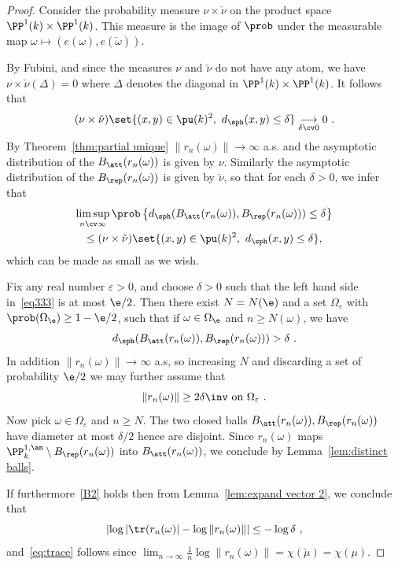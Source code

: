 \begin{proof}
Consider the probability measure $\nu\times\check{\nu}$ on the product space $\PP^1(k) \times \PP^1(k)$. This measure is the image of $\prob$ under the measurable map $\omega \mapsto (e(\omega), e(\check{\omega}))$.

By Fubini, and since the measures $\nu$ and $\check{\nu}$ do not have any atom, we have $\nu\times\check{\nu} (\Delta) = 0$ where $\Delta$ denotes the diagonal in $\PP^1(k) \times \PP^1(k)$. It follows that
\begin{equation}\label{eq333}
(\nu\times\check\nu)\set{(x,y)\in \pu(k)^2, \ d_{\sph}(x,y)\leq \delta} \underset {\delta\cv0}\longrightarrow 0~.
\end{equation}
By Theorem~\ref{thm:partial unique} $\| r_n(\omega)\|\to\infty$ a.s. and the asymptotic distribution of the $B_\att(r_n(\omega))$ is given by $\nu$. Similarly the asymptotic distribution of the $B_\rep(r_n(\omega))$ is given by $\check{\nu}$, so that for each $\delta>0$, we infer that
\begin{multline*}
\limsup_{n\cv\infty} \prob\left\{d_{\sph}(B_\att(r_n(\omega)), B_\rep(r_n(\omega)))\leq \delta\right\} \\
\leq (\nu\times\check\nu)\set{(x,y)\in \pu(k)^2, \ d_{\sph}(x,y)\leq \delta},
\end{multline*}
which can be made as small as we wish.

Fix any real number $\varepsilon>0$, and choose $\delta>0$ such that the left hand side in~\eqref{eq333} is at most $\e/2$. Then there exist $N = N(\e)$ and a set $\Omega_\varepsilon$ with $\prob(\Omega_\e)\geq 1-\e/2$, such that if $\omega \in \Omega_\e$ and $n\ge N(\omega)$, we have
\[
d_{\sph}(B_\att(r_n(\omega)), B_\rep(r_n(\omega))) > \delta~.
\]
In addition $\| r_n(\omega)\|\to\infty$ a.s, so increasing $N$ and discarding a set of probability $\e/2$ we may further assume that
\[
\| r_n(\omega) \|\ge 2\delta\inv \text{ on } \Omega_\varepsilon~.
\]
Now pick $\omega \in \Omega_\varepsilon$ and $n\ge N$. The two closed balls $B_\att(r_n(\omega)), B_\rep(r_n(\omega))$ have diameter at most $ \delta/2$ hence are disjoint. Since $r_n(\omega)$ maps $\PP^{1,\an}_k\setminus B_\rep(r_n(\omega))$ into $B_\att(r_n(\omega))$, we conclude by Lemma~\ref{lem:distinct balls}.

If furthermore~\eqref{B2} holds then from Lemma~\ref{lem:expand vector 2}, we conclude that
\[
\left| \log |\tr(r_n(\omega)| - \log \| r_n(\omega)\| \right|
\le - \log \delta~,
\]
and~\eqref{eq:trace} follows since $\lim_{n\to\infty} \frac1n \log\|r_n(\omega)\| = \chi(\check{\mu})= \chi(\mu)$.
\end{proof}


